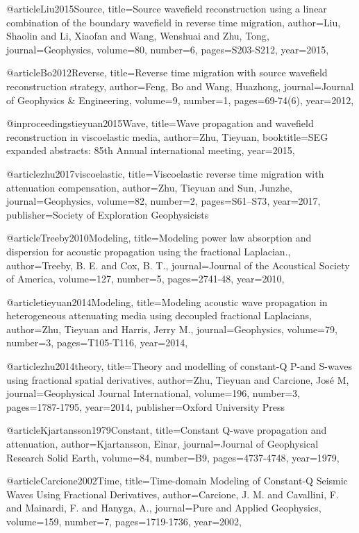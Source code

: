 {@article{Liu2015Source,
  title={Source wavefield reconstruction using a linear combination of the boundary wavefield in reverse time migration},
  author={Liu, Shaolin and Li, Xiaofan and Wang, Wenshuai and Zhu, Tong},
  journal={Geophysics},
  volume={80},
  number={6},
  pages={S203-S212},
  year={2015},
}

@article{Bo2012Reverse,
  title={Reverse time migration with source wavefield reconstruction strategy},
  author={Feng, Bo and Wang, Huazhong},
  journal={Journal of Geophysics \& Engineering},
  volume={9},
  number={1},
  pages={69-74(6)},
  year={2012},
}

@inproceedings{tieyuan2015Wave,
  title={Wave propagation and wavefield reconstruction in viscoelastic media},
  author={Zhu, Tieyuan},
  booktitle={SEG expanded abstracts: 85th Annual international meeting},
  year={2015},
}

@article{zhu2017viscoelastic,
  title={Viscoelastic reverse time migration with attenuation compensation},
  author={Zhu, Tieyuan and Sun, Junzhe},
  journal={Geophysics},
  volume={82},
  number={2},
  pages={S61--S73},
  year={2017},
  publisher={Society of Exploration Geophysicists}
}


@article{Treeby2010Modeling,
  title={Modeling power law absorption and dispersion for acoustic propagation using the fractional Laplacian.},
  author={Treeby, B. E. and Cox, B. T.},
  journal={Journal of the Acoustical Society of America},
  volume={127},
  number={5},
  pages={2741-48},
  year={2010},
}

@article{tieyuan2014Modeling,
  title={Modeling acoustic wave propagation in heterogeneous attenuating media using decoupled fractional Laplacians},
  author={Zhu, Tieyuan and Harris, Jerry M.},
  journal={Geophysics},
  volume={79},
  number={3},
  pages={T105-T116},
  year={2014},
}

@article{zhu2014theory,
  title={Theory and modelling of constant-{Q} {P}-and {S}-waves using fractional spatial derivatives},
  author={Zhu, Tieyuan and Carcione, Jos{\'e} M},
  journal={Geophysical Journal International},
  volume={196},
  number={3},
  pages={1787-1795},
  year={2014},
  publisher={Oxford University Press}
}


@article{Kjartansson1979Constant,
  title={Constant {Q}-wave propagation and attenuation},
  author={Kjartansson, Einar},
  journal={Journal of Geophysical Research Solid Earth},
  volume={84},
  number={B9},
  pages={4737-4748},
  year={1979},
}

@article{Carcione2002Time,
  title={Time-domain Modeling of Constant-{Q} Seismic Waves Using Fractional Derivatives},
  author={Carcione, J. M. and Cavallini, F. and Mainardi, F. and Hanyga, A.},
  journal={Pure and Applied Geophysics},
  volume={159},
  number={7},
  pages={1719-1736},
  year={2002},
}

}
